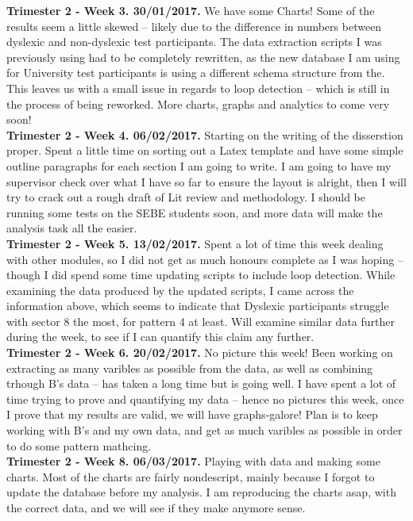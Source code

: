 \begin{appendices}
		\textbf{Trimester 2 - Week 3. 30/01/2017.}
		We have some Charts!
		Some of the results seem a little skewed – likely due to the difference in numbers between dyslexic and non-dyslexic test participants.
		The data extraction scripts I was previously using had to be completely rewritten, as the new database I am using for University test participants is using a different schema structure from the. This leaves us with a small issue in regards to loop detection – which is still in the process of being reworked.
		More charts, graphs and analytics to come very soon!\\
		
		\textbf{Trimester 2 - Week 4. 06/02/2017.}
		Starting on the writing of the disserstion proper.
		Spent a little time on sorting out a Latex template and have some simple outline paragraphs for each section I am going to write.
		I am going to have my supervisor check over what I have so far to ensure the layout is alright, then I will try to crack out a rough draft of Lit review and methodology.
		I should be running some tests on the SEBE students soon, and more data will make the analysis task all the easier.\\
		
		\textbf{Trimester 2 - Week 5. 13/02/2017.}
		Spent a lot of time this week dealing with other modules, so I did not get as much honours complete as I was hoping – though I did spend some time updating scripts to include loop detection.
		While examining the data produced by the updated scripts, I came across the information above, which seems to indicate that Dyslexic participants struggle with sector 8 the most, for pattern 4 at least.
		Will examine similar data further during the week, to see if I can quantify this claim any further.\\
		
		\textbf{Trimester 2 - Week 6. 20/02/2017.}
		No picture this week!
		Been working on extracting as many varibles as possible from the data, as well as combining  trhough B’s data – has taken a long time but is going well.
		I have spent a lot of time trying to prove and quantifying my data – hence no pictures this week, once I prove that my results are valid, we will have graphs-galore!
		Plan is to keep working with B’s and my own data, and get as much varibles as possible in order to do some pattern mathcing.\\
		
		\textbf{Trimester 2 - Week 8. 06/03/2017.}
		Playing with data and making some charts.
		Most of the charts are fairly nondescript, mainly because I forgot to update the database before my analysis.
		I am reproducing the charts asap, with the correct data, and we will see if they make anymore sense.\\
		

\end{appendices}
